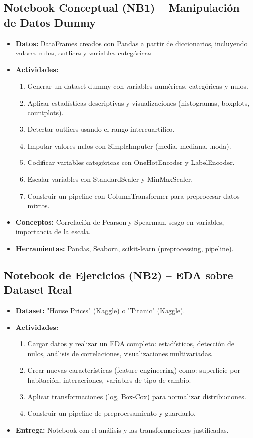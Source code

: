 \documentclass[12pt,a4paper]{article}
\begin{document}
\subsection*{Notebook Conceptual (NB1) – Manipulación de Datos Dummy}
\begin{itemize}
    \item \textbf{Datos:} DataFrames creados con Pandas a partir de diccionarios, incluyendo valores nulos, outliers y variables categóricas.
    \item \textbf{Actividades:}
    \begin{enumerate}
        \item Generar un dataset dummy con variables numéricas, categóricas y nulos.
        \item Aplicar estadísticas descriptivas y visualizaciones (histogramas, boxplots, countplots).
        \item Detectar outliers usando el rango intercuartílico.
        \item Imputar valores nulos con SimpleImputer (media, mediana, moda).
        \item Codificar variables categóricas con OneHotEncoder y LabelEncoder.
        \item Escalar variables con StandardScaler y MinMaxScaler.
        \item Construir un pipeline con ColumnTransformer para preprocesar datos mixtos.
    \end{enumerate}
    \item \textbf{Conceptos:} Correlación de Pearson y Spearman, sesgo en variables, importancia de la escala.
    \item \textbf{Herramientas:} Pandas, Seaborn, scikit-learn (preprocessing, pipeline).
\end{itemize}

\subsection*{Notebook de Ejercicios (NB2) – EDA sobre Dataset Real}
\begin{itemize}
    \item \textbf{Dataset:} "House Prices" (Kaggle) o "Titanic" (Kaggle).
    \item \textbf{Actividades:}
    \begin{enumerate}
        \item Cargar datos y realizar un EDA completo: estadísticos, detección de nulos, análisis de correlaciones, visualizaciones multivariadas.
        \item Crear nuevas características (feature engineering) como: superficie por habitación, interacciones, variables de tipo de cambio.
        \item Aplicar transformaciones (log, Box-Cox) para normalizar distribuciones.
        \item Construir un pipeline de preprocesamiento y guardarlo.
    \end{enumerate}
    \item \textbf{Entrega:} Notebook con el análisis y las transformaciones justificadas.
\end{itemize}
\end{document}

